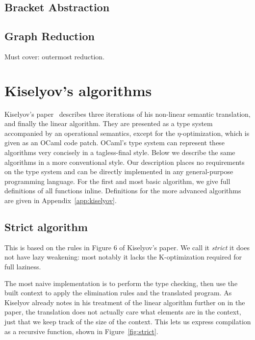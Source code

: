 \documentclass[conference]{IEEEtran}
\begin{document}
\subsection{Bracket Abstraction}

\subsection{Graph Reduction}
Must cover: outermost reduction.

\section{Kiselyov's algorithms}
\label{sec:kiselyov}
Kiselyov's paper~\cite{kiselyov_lambda_2018} describes three iterations of his non-linear semantic translation, and finally the linear algorithm.
They are presented as a type system accompanied by an operational semantics, except for the $\eta$-optimization, which is given as an OCaml code patch.
OCaml's type system can represent these algorithms very concisely in a tagless-final style.
Below we describe the same algorithms in a more conventional style.
Our description places no requirements on the type system and can be directly implemented in any general-purpose programming language.
For the first and most basic algorithm, we give full definitions of all functions inline.
Definitions for the more advanced algorithms are given in Appendix~\ref{app:kiselyov}.

\subsection{Strict algorithm}
This is based on the rules in Figure 6 of Kiselyov's paper.
We call it \textit{strict} it does not have lazy weakening: most notably it lacks the K-optimization required for full laziness.

The most naive implementation is to perform the type checking, then use the built context to apply the elimination rules and the translated program.
As Kiselyov already notes in his treatment of the linear algorithm further on in the paper, the translation does not actually care what elements are in the context, just that we keep track of the size of the context.
This lets us express compilation as a recursive function, shown in Figure~\ref{fig:strict}.
\end{document}
